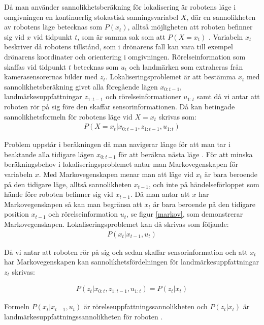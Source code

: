 Då man använder sannolikhetsberäkning för lokalisering är robotens läge i omgivningen en kontinuerlig stokastisk sanningsvariabel $X$, där en sannolikheten av robotens läge betecknas som $P(x_t)$, alltså möjligheten att roboten befinner sig vid $x$ vid tidpunkt $t$, som är samma sak som att $P(X = x_t)$ \citep{ProbabilisticRobotics}. Variabeln $x_t$ beskriver då robotens tillstånd, som i drönarens fall kan vara till exempel drönarens koordinater och orientering i omgivningen. Rörelseinformation som skaffas vid tidpunkt $t$ betecknas som $u_t$ och landmärken som extraheras från kamerasensorernas bilder med $z_t$. Lokaliseringsproblemet är att bestämma $x_t$ med sannolikhetsberäkning givet alla föregående lägen $x_{0:t-1}$, landmärkesuppfattningar $z_{1:t-1}$ och rörelseinformationer $u_{1:t}$ samt då vi antar att roboten rör på sig före den skaffar sensorinformationen. Då kan betingade sannolikhetsformeln för robotens läge vid $X = x_t$ skrivas som:
\begin{align}
    P( X = x_t | x_{0:t-1}, z_{1:t-1}, u_{1:t})
\end{align}

Problem uppstår i beräkningen då man navigerar länge för att man tar i beaktande alla tidigare lägen $x_{0:t-1}$ för att beräkna nästa läge \citep{ProbabilisticRobotics}. För att minska beräkningsbehov i lokaliseringsproblemet antar man Markovegenskapen för variabeln $x$. Med Markovegenskapen menar man att läge vid $x_t$ är bara beroende på den tidigare läge, alltså sannolikheten $x_{t-1}$, och inte på händelseförloppet som hände före roboten befinner sig vid $x_{t-1}$. Då man antar att $x$ har Markovegenskapen så kan man begränsa att $x_t$ är bara beroende på den tidigare position $x_{t-1}$ och rörelseinformation $u_t$, se figur \ref{markov}, som demonstrerar Markovegenskapen. Lokaliseringsproblemet kan då skrivas som följande:
\begin{align}
    P(x_t | x_{t-1}, u_{t})
\end{align}

Då vi antar att roboten rör på sig och sedan skaffar sensorinformation och att $x_t$ har Markovegenskapen kan sannolikhetsfördelningen för landmärkesuppfattningar $z_t$ skrivas:

\begin{align}
    P(z_t | x_{0:t}, z_{1:t-1}, u_{1:t}) = P(z_t|x_t)
\end{align}

Formeln $P(x_t|x_{t-1}, u_{t})$ är rörelseuppfattningssannolikheten och $P(z_t|x_t)$ är landmärkesuppfattningssannolikheten för roboten \citep{ProbabilisticRobotics}. 

